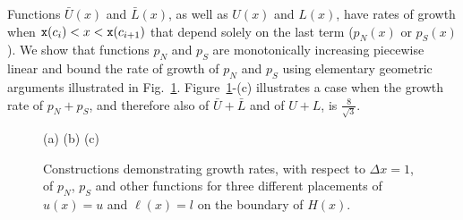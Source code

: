 \documentclass[11pt,USenglish]{article}
\theoremstyle{plain}%
\theoremstyle{definition}
\begin{document}
{Functions ${\bar U}(x)$ and ${\bar L}(x)$, 
as well as $U(x)$ and $L(x)$, have rates of growth when
${\tt x}(c_i) < x < {\tt x}(c_{i+1})$ that depend solely on the
last term ($p_N(x)$ or $p_S(x)$).
We show that functions $p_N$ and 
$p_S$ are monotonically increasing piecewise linear 
 and bound the rate of growth of $p_N$ and $p_S$ using elementary geometric 
arguments illustrated in Fig.~\ref{fig:growth}. Figure~\ref{fig:growth}-(c)
illustrates a case when the growth rate of $p_N+p_S$, and therefore also of 
${\bar U}+{\bar L}$ and of $U+L$, is $\frac{8}{\sqrt{3}}$.

\begin{figure}
\growth

\hspace{2cm} (a) \hspace{3.8cm} (b) \hspace{4.2cm} (c)
\caption{Constructions demonstrating growth rates, with respect to 
$\Delta x = 1$, of $p_N$, $p_S$ and other
functions for three different placements of $u(x)=u$ and $\ell(x)=l$ on the
boundary of $H(x)$. 
}
\label{fig:growth}
\end{figure}



}
{}
\end{document}
